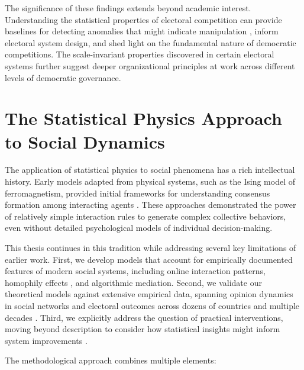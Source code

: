 The significance of these findings extends beyond academic interest. Understanding the statistical properties of electoral competition can provide baselines for detecting anomalies that might indicate manipulation \cite{statistical-detection-of-systematic-election-irregularities, testing-for-voter-rigging-in-small-polling-stations, klimek2012statistical, jimenez2017testing, brigaldino2011elections, belarus2012parliamentary, belarusian2019parliamentary, belarus2020presidential}, inform electoral system design, and shed light on the fundamental nature of democratic competitions. The scale-invariant properties discovered in certain electoral systems further suggest deeper organizational principles at work across different levels of democratic governance.

\section{The Statistical Physics Approach to Social Dynamics}

The application of statistical physics to social phenomena has a rich intellectual history. Early models adapted from physical systems, such as the Ising model of ferromagnetism, provided initial frameworks for understanding consensus formation among interacting agents \cite{galam2012sociophysics}. These approaches demonstrated the power of relatively simple interaction rules to generate complex collective behaviors, even without detailed psychological models of individual decision-making.

This thesis continues in this tradition while addressing several key limitations of earlier work. First, we develop models that account for empirically documented features of modern social systems, including online interaction patterns, homophily effects \cite{birds-of-a-feather-homophily-in-social-networks}, and algorithmic mediation. Second, we validate our theoretical models against extensive empirical data, spanning opinion dynamics in social networks and electoral outcomes across dozens of countries and multiple decades \cite{universal-statistics-of-competition, voter-turnouts-govern-key-electoral-statistics}. Third, we explicitly address the question of practical interventions, moving beyond description to consider how statistical insights might inform system improvements \cite{depolarization-of-echo-chambers-by-random-dynamical-nudge}.

The methodological approach combines multiple elements:

